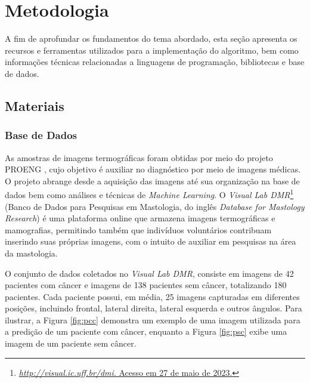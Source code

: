 

\section{\esp Metodologia} \label{metodologia}
A fim de aprofundar os fundamentos do tema abordado, esta seção apresenta os recursos e ferramentas utilizados para a implementação do algoritmo, bem como informações técnicas relacionadas a linguagens de programação, bibliotecas e base de dados.



\subsection{\esp Materiais} \label{materiais}


\subsubsection{\esp Base de Dados} \label{database}

As amostras de imagens termográficas foram obtidas por meio do projeto PROENG , cujo objetivo é auxiliar no diagnóstico por meio de imagens médicas. O projeto abrange desde a aquisição das imagens até sua organização na base de dados bem como análises e técnicas de \textit{Machine Learning}. O \textit{Visual Lab DMR}\footnote{\href{http://visual.ic.uff.br/dmi}{\textit{http://visual.ic.uff.br/dmi}. Acesso em 27 de maio de 2023.}} (Banco de Dados para Pesquisas em Mastologia, do inglês \textit{Database for Mastology Research}) é uma plataforma online que armazena imagens termográficas e mamografias, permitindo também que indivíduos voluntários contribuam inserindo suas próprias imagens, com o intuito de auxiliar em pesquisas na área da mastologia.

O conjunto de dados coletados no \textit{Visual Lab DMR}, consiste em imagens de 42 pacientes com câncer e imagens de 138 pacientes sem câncer, totalizando 180 pacientes. Cada paciente possui, em média, 25 imagens capturadas em diferentes posições, incluindo frontal, lateral direita, lateral esquerda e outros ângulos. Para ilustrar, a Figura \ref{fig:pcc} demonstra um exemplo de uma imagem utilizada para a predição de um paciente com câncer, enquanto a Figura \ref{fig:psc} exibe uma imagem de um paciente sem câncer. 


